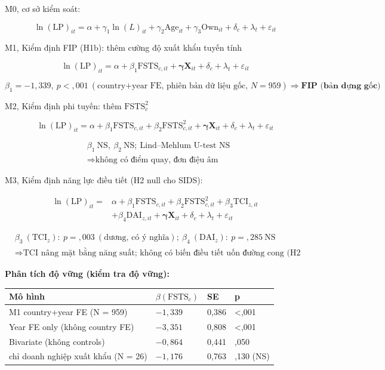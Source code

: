\documentclass[
  a4paper,
  13pt]{extreport}
\begin{document}
M0, cơ sở kiểm soát:

\[\ln(\mathrm{LP})_{it} = \alpha + \gamma_1 \ln(L)_{it} + \gamma_2 \mathrm{Age}_{it} + \gamma_3 \mathrm{Own}_{it} + \delta_c + \lambda_t + \varepsilon_{it}\]

M1, Kiểm định FIP (H1b): thêm cường độ xuất khẩu tuyến tính

\[\ln(\mathrm{LP})_{it} = \alpha + \beta_1 \mathrm{FSTS}_{c,it} + \boldsymbol{\gamma}\mathbf{X}_{it} + \delta_c + \lambda_t + \varepsilon_{it}\]

\[\beta_1 = -1{,}339,\ p < {,}001\ (\text{country+year FE, phiên bản dữ liệu gốc, } N = 959) \Rightarrow \textbf{FIP (bản dựng gốc)}\]

M2, Kiểm định phi tuyến: thêm \(\mathrm{FSTS}_{c}^{2}\)

\[\ln(\mathrm{LP})_{it} = \alpha + \beta_1 \mathrm{FSTS}_{c,it} + \beta_2 \mathrm{FSTS}_{c,it}^{2} + \boldsymbol{\gamma}\mathbf{X}_{it} + \delta_c + \lambda_t + \varepsilon_{it}\]

\[\begin{aligned}
& \beta_1\ \text{NS},\ \beta_2\ \text{NS};\ \text{Lind–Mehlum U-test NS} \\
& \Rightarrow \text{không có điểm quay, đơn điệu âm}
\end{aligned}\]

M3, Kiểm định năng lực điều tiết (H2 null cho SIDS):

\[\begin{aligned}
\ln(\mathrm{LP})_{it} = {} & \alpha + \beta_1 \mathrm{FSTS}_{c,it} + \beta_2 \mathrm{FSTS}_{c,it}^{2} + \beta_3 \mathrm{TCI}_{z,it} \\
& + \beta_4 \mathrm{DAI}_{z,it} + \boldsymbol{\gamma}\mathbf{X}_{it} + \delta_c + \lambda_t + \varepsilon_{it}
\end{aligned}\]

\[\begin{aligned}
& \beta_3\ (\mathrm{TCI}_{z}):\ p = {,}003\ (\text{dương, có ý nghĩa});\ \beta_4\ (\mathrm{DAI}_{z}):\ p = {,}285\ \text{NS} \\
& \Rightarrow \text{TCI nâng mặt bằng năng suất; không có biến điều tiết uốn đường cong (H2 null)}
\end{aligned}\]

\textbf{Phân tích độ vững (kiểm tra độ vững):}

\begin{longtable}[]{@{}llll@{}}
\toprule\noalign{}
Mô hình & \(\beta(\mathrm{FSTS}_c)\) & SE & p \\
\midrule\noalign{}
\endhead
\bottomrule\noalign{}
\endlastfoot
M1 country+year FE (N = 959) & \(-1{,}339\) & 0,386 & \textless,001 \\
Year FE only (không country FE) & \(-3{,}351\) & 0,808 &
\textless,001 \\
Bivariate (không controls) & \(-0{,}864\) & 0,441 & ,050 \\
chỉ doanh nghiệp xuất khẩu (N = 26) & \(-1{,}176\) & 0,763 & ,130
(NS) \\
\end{longtable}
\end{document}
